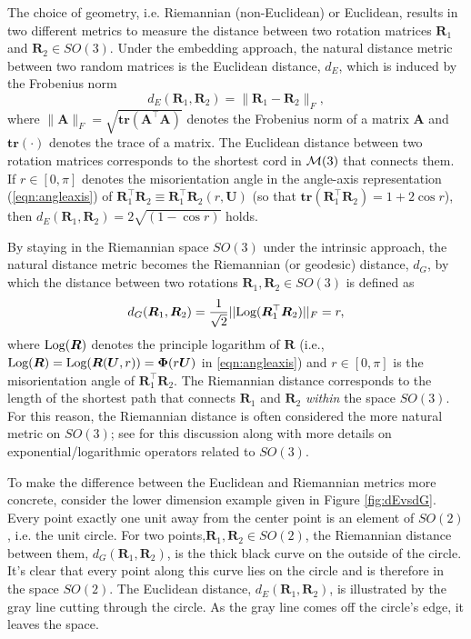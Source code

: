 The choice of geometry, i.e. Riemannian (non-Euclidean) or Euclidean,
results in two different metrics to measure the distance
between two rotation matrices $\bm{R}_1$ and $\bm{R}_2 \in
SO(3)$. Under the embedding approach, the natural distance
metric between two random matrices is the Euclidean distance, $d_E$,
which is induced by the Frobenius norm
\begin{equation}
\label{d_E}
d_E(\bm{R}_1,\bm{R}_2)=\|\bm{R}_1-\bm{R}_2\|_F, 
\end{equation}
where $\|\bm{A}\|_F = \sqrt{\mathbf{tr}({\bm A^\top \bm A})}$ denotes the Frobenius norm of a matrix $\bm A$ and $\mathbf{tr}(\cdot)$ denotes the trace of a matrix.
The Euclidean distance between two rotation matrices corresponds to the shortest cord in $\mathcal{M}
(3)$  that connects them.  If $r\in[0,\pi]$ denotes the misorientation angle
in the angle-axis representation (\ref{eqn:angleaxis}) of $\bm{R}_1^\top \bm{R}_2 \equiv \bm{R}_1^\top \bm{R}_2(r,\bm{U})$ (so that $\mathbf{tr}(\bm{R}_1^\top \bm{R}_2) =1 +2 \cos r$), then
$d_E(\bm{R}_1,\bm{R}_2) = 2\sqrt{(1-\cos r)}$ holds.

By staying in the Riemannian space $SO(3)$ under the intrinsic approach, the natural distance metric becomes the Riemannian (or geodesic) distance, $d_G$, by which the distance between two
rotations $\bm{R}_1,\bm{R}_2\in SO(3)$  is  defined as
\begin{equation}
\label{d_R}
d_G(\bm{R}_1,\bm{R}_2)=  \frac{1}{\sqrt{2}}||
\text{Log}(\bm{R}_1^\top\bm{R}_2)||_F = r,
\end{equation}
where $\text{Log}(\bm{R})$ denotes the principle logarithm of
$\bm{R}$ (i.e., $\text{Log}(\bm{R}) = \text{Log}(\bm{R}(\bm U,r))= \bm \Phi(r\bm U)$ in \eqref{eqn:angleaxis}) and $r\in[0,\pi]$   is the misorientation angle of $\bm{R}_1^\top \bm{R}_2$. 
The Riemannian distance corresponds to the length of the shortest path that connects $\bm{R}_1$ and $\bm{R}_2$ {\it within} the space $SO(3)$. For this reason, the Riemannian distance is often considered
the more natural metric on $SO(3)$; see \cite{moakher02} for this discussion along with more details
on exponential/logarithmic operators related to $SO(3)$.    
 
To make the difference between the Euclidean and Riemannian metrics more concrete, consider the lower dimension example given in Figure \ref{fig:dEvsdG}.  Every point exactly one unit away from the center point is an element of $SO(2)$, i.e. the unit circle.  For two points,$\bm R_1,\bm R_2\in SO(2)$, the Riemannian distance between them, $d_G(\bm R_1,\bm R_2)$,  is the thick black curve on the outside of the circle.  It's clear that every point along this curve lies on the circle and is therefore in the space $SO(2)$.  The Euclidean distance, $d_E(\bm R_1,\bm R_2)$, is illustrated by the gray line cutting through the circle.  As the gray line comes off the circle's edge, it leaves the space.

